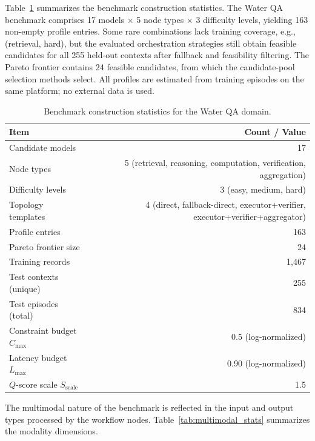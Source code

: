 \documentclass[manuscript,review,anonymous]{acmart}
\begin{document}
Table~\ref{tab:benchmark_stats} summarizes the benchmark construction statistics. The Water QA benchmark comprises 17 models $\times$ 5 node types $\times$ 3 difficulty levels, yielding 163 non-empty profile entries. Some rare combinations lack training coverage, e.g., (retrieval, hard), but the evaluated orchestration strategies still obtain feasible candidates for all 255 held-out contexts after fallback and feasibility filtering. The Pareto frontier contains 24 feasible candidates, from which the candidate-pool selection methods select. All profiles are estimated from training episodes on the same platform; no external data is used.

\begin{table}[t]
\centering
\caption{Benchmark construction statistics for the Water QA domain.}
\label{tab:benchmark_stats}
\small
\begin{tabular}{lr}
\toprule
\textbf{Item} & \textbf{Count / Value} \\
\midrule
Candidate models & 17 \\
Node types & 5 (retrieval, reasoning, computation, verification, aggregation) \\
Difficulty levels & 3 (easy, medium, hard) \\
Topology templates & 4 (direct, fallback-direct, executor+verifier, executor+verifier+aggregator) \\
Profile entries & 163 \\
Pareto frontier size & 24 \\
Training records & 1,467 \\
Test contexts (unique) & 255 \\
Test episodes (total) & 834 \\
Constraint budget $C_{\max}$ & 0.5 (log-normalized) \\
Latency budget $L_{\max}$ & 0.90 (log-normalized) \\
$Q$-score scale $S_{\text{scale}}$ & 1.5 \\
\bottomrule
\end{tabular}
\end{table}

The multimodal nature of the benchmark is reflected in the input and output types processed by the workflow nodes. Table~\ref{tab:multimodal_stats} summarizes the modality dimensions.
\end{document}
